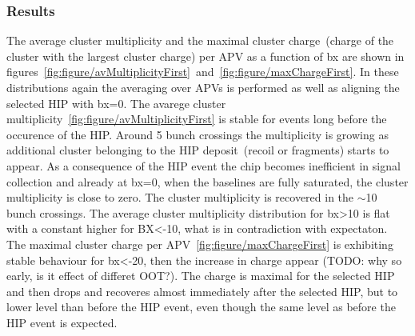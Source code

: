 \subsubsection{Results}

The average cluster multiplicity and the maximal cluster charge~(charge of the cluster with the largest cluster charge) per APV as a function of bx are shown in figures~\ref{fig:figure/avMultiplicityFirst}~and~\ref{fig:figure/maxChargeFirst}. In these distributions again the averaging over APVs is performed as well as aligning the selected HIP with bx=0. The avarege cluster multiplicity~\ref{fig:figure/avMultiplicityFirst} is stable for events long before the occurence of the HIP. Around 5 bunch crossings the multiplicity is growing as additional cluster belonging to the HIP deposit~(recoil or fragments) starts to appear. As a consequence of the HIP event the chip becomes inefficient in signal collection and already at bx=0, when the baselines are fully saturated, the cluster multiplicity is close to zero. The cluster multiplicity is recovered in the $\sim$10 bunch crossings. The average cluster multiplicity distribution for bx>10 is flat with a constant higher for BX<-10, what is in contradiction with expectaton. The maximal cluster charge per APV~\ref{fig:figure/maxChargeFirst} is exhibiting stable behaviour for bx<-20, then the increase in charge appear (TODO: why so early, is it effect of differet OOT?). The charge is maximal for the selected HIP and then drops and recoveres almost immediately after the selected HIP, but to lower level than before the HIP event, even though the same level as before the HIP event is expected. 



